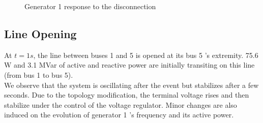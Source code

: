 \documentclass[a4paper, 12pt]{report}
\begin{document}
\begin{figure}[H]
\caption{Generator 1 response to the disconnection}
\end{figure}

\newpage
\subsection{Line Opening}
\label{DisconnectLine}

At $t=1s$, the line between buses 1 and 5 is opened at its bus 5 's extremity. 75.6 W and 3.1 MVar of active and reactive power are initially transiting on this line (from bus 1 to bus 5).\\

We observe that the system is oscillating after the event but stabilizes after a few seconds. Due to the topology modification, the terminal voltage rises and then stabilize under the control of the voltage regulator. Minor changes are also induced on the evolution of generator 1 's frequency and its active power.\\
\end{document}
